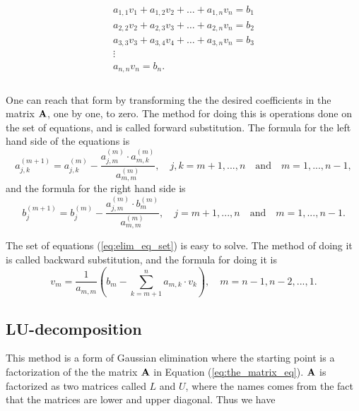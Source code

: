 \documentclass[12pt]{article}
\begin{document}
\begin{flushleft}
\begin{equation}\label{eq:elim_eq_set}
    \begin{array}{c}
    a_{1,1}v_{1} + a_{1,2}v_{2} + \dots + a_{1,n}v_{n} = b_{1}\\
    a_{2,2}v_{2} + a_{2,3}v_{3} + \dots + a_{2,n}v_{n} = b_{2}\\
    a_{3,3}v_{3} + a_{3,4}v_{4} + \dots + a_{3,n}v_{n} = b_{3}\\
    \vdots\\
    a_{n,n}v_{n} = b_{n}.\\    
    \end{array}
\end{equation}\\
\vspace{5mm}
One can reach that form by transforming the the desired coefficients in the matrix $\bf A$, one by one, to zero. The method for doing this is operations done on the set of equations, and is called forward substitution. The formula for the left hand side of the equations is\\

\begin{equation}\label{eq:lhs_forw}
a_{j,k}^{(m+1)} = a_{j,k}^{(m)}-\frac{a_{j,m}^{(m)}\cdot a_{m,k}^{(m)}}{a_{m,m}^{(m)}},\quad j,k = m+1,...,n\quad\text{and}\quad m = 1,...,n-1,
\end{equation}
\newpage
and the formula for the right hand side is\\
\vspace{5mm}
\begin{equation}\label{eq:rhs_forw}
b_{j}^{(m+1)} = b_{j}^{(m)}-\frac{a_{j,m}^{(m)}\cdot b_{m}^{(m)}}{a_{m,m}^{(m)}},\quad j = m+1,...,n\quad\text{and}\quad m = 1,...,n-1.
\end{equation}
\vspace{5mm}

The set of equations (\ref{eq:elim_eq_set}) is easy to solve. The method of doing it is called backward substitution, and the formula for doing it is\\
\vspace{5mm}
\begin{equation}\label{eq:backw}
v_{m} = \frac{1}{a_{m,m}}\left(b_{m} - \sum_{k=m+1}^{n}a_{m,k}\cdot v_{k}\right),\quad m = n-1,n-2,...,1.
\end{equation}
 \vspace{5mm}
\subsection*{LU-decomposition}
This method is a form of Gaussian elimination where the starting point is a factorization of the the matrix $\bf A$ in Equation (\ref{eq:the_matrix_eq}). $\bf A$ is factorized as two matrices called $L$ and $U$, where the names comes from the fact that the matrices are lower and upper diagonal. Thus we have\\


\end{flushleft}
\end{document}
